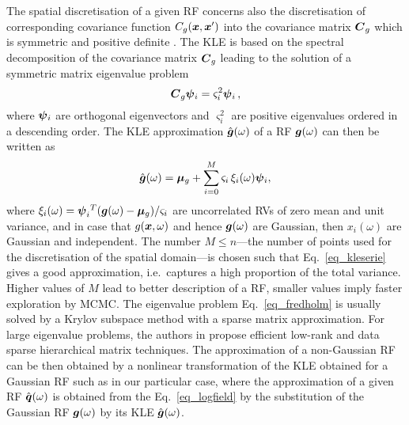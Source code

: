 \documentclass[preprint,12pt]{elsarticle}
\newcommand{\vek}[1]{\mathchoice{\displaystyle\boldsymbol#1}
{\textstyle\boldsymbol#1}{\scriptstyle\boldsymbol#1}
{\scriptscriptstyle\boldsymbol#1}}
\begin{document}
The spatial discretisation of a given RF concerns also the discretisation
of corresponding covariance function
$C_g(\vek{x},\vek{x}^{\prime})$ into the covariance matrix
$\vek{C}_g$ which is symmetric and positive definite
\cite{Matthies:2005:CMAME, Matthies:2007:IB}. The KLE is based on the spectral
decomposition of the covariance matrix $\vek{C}_g$ leading to the
solution of a symmetric matrix eigenvalue problem
\begin{equation}
  \vek{C}_g \vek{\psi}_i = \varsigma_i^2 \vek{\psi}_i \, ,
\label{eq_fredholm}
\end{equation}
where $\vek{\psi}_i$ are orthogonal eigenvectors and $\varsigma_i^2$ are
positive eigenvalues ordered in a descending order. The KLE approximation
$\hat{\vek{g}}(\omega)$ of a RF $\vek{g}(\omega)$
can then be written as
\begin{equation}
\hat{\vek{g}}(\omega) =
\vek{\mu}_g+\sum_{i=0}^{M} \varsigma_{i} \, \xi_{i}(\omega) \vek{\psi}_{i},
\label{eq_kleserie}
\end{equation}
where $\xi_{i}(\omega) = \vek{\psi_i}^T (\vek{g}(\omega) -
\vek{\mu}_g)/\varsigma_i$ are uncorrelated RVs of zero mean and unit
variance, and in case that $g(\vek{x}, \omega)$ and hence
$\vek{g}(\omega)$ are Gaussian, then $x_i(\omega)$ are Gaussian and
independent. The number $M \leq n$---the number of points used for the
discretisation of the spatial domain---is chosen such that
Eq.~\eqref{eq_kleserie} gives a good approximation, i.e.\ captures a
high proportion of the total variance.
Higher values of $M$ lead to better description of a RF, smaller
values imply faster exploration by MCMC. The eigenvalue problem
Eq.~\eqref{eq_fredholm} is usually solved by a Krylov subspace method with
a sparse matrix approximation. For large eigenvalue problems, the
authors in \cite{Khoromskij:2008} propose  efficient low-rank and
data sparse hierarchical matrix techniques. The approximation of a
non-Gaussian RF can be then obtained by a nonlinear transformation of
the KLE obtained for a Gaussian RF such as in our particular case,
where the approximation of a given RF $\hat{\vek{q}}(\omega)$ is
obtained from the Eq.~\eqref{eq_logfield} by the substitution of the
Gaussian RF $\vek{g}(\omega)$ by its KLE $\hat{\vek{g}}(\omega)$.
\end{document}
